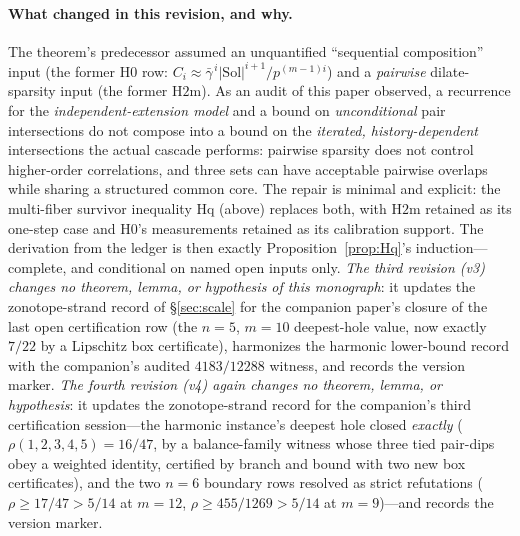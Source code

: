 \paragraph{What changed in this revision, and why.}
The theorem's predecessor assumed an unquantified ``sequential
composition'' input (the former $\mathrm{H0}$ row: $C_i\approx
\bar\gamma^{\,i}|\mathrm{Sol}|^{i+1}/p^{(m-1)i}$) and a \emph{pairwise}
dilate-sparsity input (the former $\mathrm{H2m}$). As an audit of this
paper observed, a recurrence for the \emph{independent-extension model}
and a bound on \emph{unconditional} pair intersections do not compose
into a bound on the \emph{iterated, history-dependent} intersections the
actual cascade performs: pairwise sparsity does not control
higher-order correlations, and three sets can have acceptable pairwise
overlaps while sharing a structured common core. The repair is minimal
and explicit: the multi-fiber survivor inequality $\mathrm{Hq}$ (above)
replaces both, with $\mathrm{H2m}$ retained as its one-step case and
$\mathrm{H0}$'s measurements retained as its calibration support. The
derivation from the ledger is then exactly
Proposition~\ref{prop:Hq}'s induction---complete, and conditional on
named open inputs only.
\emph{The third revision (v3) changes no theorem, lemma, or hypothesis
of this monograph}: it updates the zonotope-strand record of
\S\ref{sec:scale} for the companion paper's closure of the last open
certification row (the $n=5$, $m=10$ deepest-hole value, now exactly
$7/22$ by a Lipschitz box certificate), harmonizes the harmonic
lower-bound record with the companion's audited $4183/12288$ witness,
and records the version marker. \emph{The fourth revision (v4) again
changes no theorem, lemma, or hypothesis}: it updates the
zonotope-strand record for the companion's third certification
session---the harmonic instance's deepest hole closed \emph{exactly}
($\rho(1,2,3,4,5)=16/47$, by a balance-family witness whose three tied
pair-dips obey a weighted identity, certified by branch and bound with
two new box certificates), and the two $n=6$ boundary rows resolved as
strict refutations ($\rho\ge17/47>5/14$ at $m=12$,
$\rho\ge455/1269>5/14$ at $m=9$)---and records the version marker.

